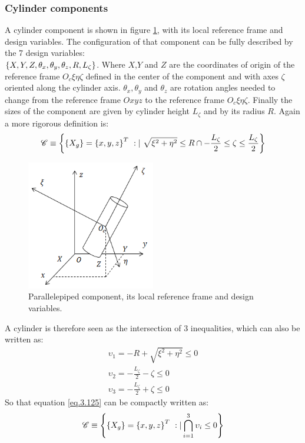   \subsubsection{Cylinder components}
  A cylinder component is shown in figure \ref{fig:3.31}, with its local reference frame and design variables.
  The configuration of that component can be fully described by the 7 design variables:\\ $\left\lbrace{X,Y,Z,\theta_x ,\theta_y ,\theta_z ,R ,L_\zeta}\right \rbrace$. Where $X$,$Y$ and $Z$ are the coordinates of origin of the reference frame $O_c\xi \eta \zeta$ defined in the center of the component and with axes $\zeta$ oriented  along the cylinder axis. $\theta_x ,\theta_y$ and $\theta_z$ are rotation angles needed to change from the reference frame   $Oxyz$ to the reference frame $O_c\xi \eta \zeta$. Finally the sizes of the component are given by cylinder height  $L_\zeta$ and by its radius $R$. Again a more rigorous definition is:
    \begin{equation}
    \label{eq.3.125}
    \mathscr{C}\equiv\left\lbrace{\ensuremath\left\lbrace{X_g}\right \rbrace=\ensuremath\left\lbrace{x,y,z}\right \rbrace^T\ :| \ \sqrt{\xi^2+\eta^2}\leq R\cap-\frac{L_\zeta}{2}\leq\zeta\leq\frac{L_\zeta}{2}}\right \rbrace
    \end{equation}
     \begin{figure}[!ht]
     \centering
      \includegraphics[width=0.5\textwidth]{images/Ch3/cylinder_component}
    \caption{Parallelepiped component, its local reference frame and design variables.}
    \label{fig:3.31}       %
    \end{figure}
    A cylinder is therefore seen as the intersection of 3 inequalities, which can also be written as:
    \begin{eqnarray}
    \upsilon_1=-R+ \sqrt{\xi^2+\eta^2}\leq 0\\
        \upsilon_2=-\frac{L_\zeta}{2}-\zeta\leq 0\\
        \upsilon_3=-\frac{L_\zeta}{2}+\zeta\leq 0
    \end{eqnarray}
    So that equation \eqref{eq.3.125} can be compactly written as:
    \begin{equation}
        \label{eq.3.129}
        \mathscr{C}\equiv\VectorVar{\VectorVar{X_g}=\VectorVar{x,y,z}^T\ :| \bigcap_{i=1}^3{\upsilon_i\leq 0}}
        \end{equation}
